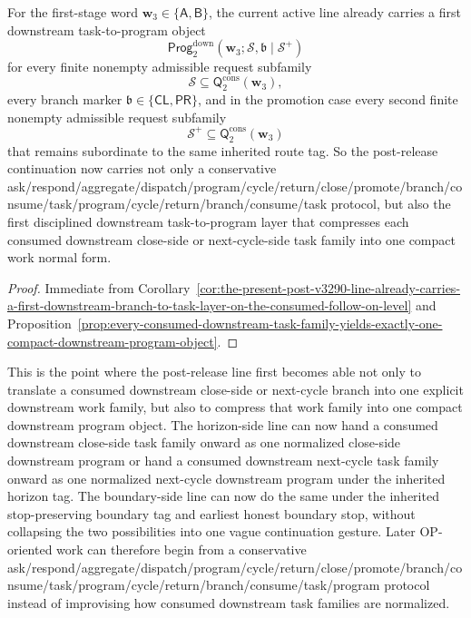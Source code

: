 \begin{corollary}
\label{cor:the-present-post-v3290-line-already-carries-a-first-downstream-task-to-program-layer-on-the-consumed-follow-on-level}
For the first-stage word \(\mathbf w_3\in\{\mathsf A,\mathsf B\}\), the current active line already carries a first downstream task-to-program object
\[
  \mathsf{Prog}^{\mathrm{down}}_{2}(\mathbf w_3;\mathcal S,\mathfrak b\mid\mathcal S^{+})
\]
for every finite nonempty admissible request subfamily
\[
  \mathcal S\subseteq \mathsf{Q}^{\mathrm{cons}}_{2}(\mathbf w_3),
\]
every branch marker \(\mathfrak b\in\{\mathsf{CL},\mathsf{PR}\}\), and in the promotion case every second finite nonempty admissible request subfamily
\[
  \mathcal S^{+}\subseteq \mathsf{Q}^{\mathrm{cons}}_{2}(\mathbf w_3)
\]
that remains subordinate to the same inherited route tag. So the post-release continuation now carries not only a conservative ask/respond/aggregate/dispatch/program/cycle/return/close/promote/branch/consume/task/program/cycle/return/branch/consume/task protocol, but also the first disciplined downstream task-to-program layer that compresses each consumed downstream close-side or next-cycle-side task family into one compact work normal form.
\end{corollary}

\begin{proof}
Immediate from Corollary~\ref{cor:the-present-post-v3290-line-already-carries-a-first-downstream-branch-to-task-layer-on-the-consumed-follow-on-level} and Proposition~\ref{prop:every-consumed-downstream-task-family-yields-exactly-one-compact-downstream-program-object}.
\end{proof}

\begin{remark}
\label{rem:what-the-first-downstream-task-to-program-layer-on-the-consumed-follow-on-level-now-buys}
This is the point where the post-release line first becomes able not only to translate a consumed downstream close-side or next-cycle branch into one explicit downstream work family, but also to compress that work family into one compact downstream program object. The horizon-side line can now hand a consumed downstream close-side task family onward as one normalized close-side downstream program or hand a consumed downstream next-cycle task family onward as one normalized next-cycle downstream program under the inherited horizon tag. The boundary-side line can now do the same under the inherited stop-preserving boundary tag and earliest honest boundary stop, without collapsing the two possibilities into one vague continuation gesture. Later OP-oriented work can therefore begin from a conservative ask/respond/aggregate/dispatch/program/cycle/return/close/promote/branch/consume/task/program/cycle/return/branch/consume/task/program protocol instead of improvising how consumed downstream task families are normalized.
\end{remark}



